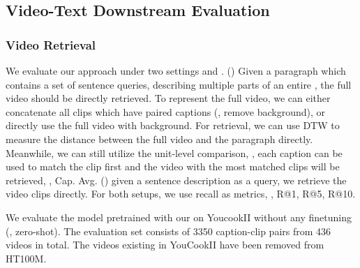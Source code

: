 \subsection{Video-Text Downstream Evaluation}

\subsubsection{Video Retrieval}




 We evaluate our approach under two settings  and . () Given a paragraph which contains a set of sentence queries, describing multiple parts of an entire \longvideo{}, the full video should be directly retrieved. To represent the full video, we can either concatenate all clips which have paired captions (\ie, remove background), or directly use the full video with background. 
For retrieval, we can use DTW to measure the distance between the full video and the paragraph directly. Meanwhile, we can still utilize the unit-level comparison, \ie, each caption can be used to match the clip first and the video with the most matched clips will be retrieved, \ie, Cap. Avg.
() given a sentence description as a query, we retrieve the video clips directly.
For both setups, we use recall as metrics, \ie, R@1, R@5, R@10.

 We evaluate the model pretrained with our \approach{} on YoucookII\citep{zhou2018towards} without any finetuning (\ie, zero-shot). The evaluation set consists of 3350 caption-clip pairs from 436 videos in total.
The videos existing in YouCookII have been removed from HT100M.

